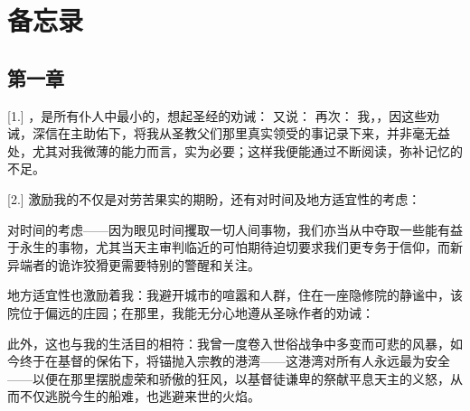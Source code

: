 
\chapter{备忘录}


\par


\section{第一章}

\par

[1.] ，是所有仆人中最小的，想起圣经的劝诫： 又说： 再次： 我，，因这些劝诫，深信在主助佑下，将我从圣教父们那里真实领受的事记录下来，并非毫无益处，尤其对我微薄的能力而言，实为必要；这样我便能通过不断阅读，弥补记忆的不足。\par

[2.] 激励我的不仅是对劳苦果实的期盼，还有对时间及地方适宜性的考虑：\par

对时间的考虑——因为眼见时间攫取一切人间事物，我们亦当从中夺取一些能有益于永生的事物，尤其当天主审判临近的可怕期待迫切要求我们更专务于信仰，而新异端者的诡诈狡猾更需要特别的警醒和关注。\par

地方适宜性也激励着我：我避开城市的喧嚣和人群，住在一座隐修院的静谧中，该院位于偏远的庄园；在那里，我能无分心地遵从圣咏作者的劝诫：\par

此外，这也与我的生活目的相符：我曾一度卷入世俗战争中多变而可悲的风暴，如今终于在基督的保佑下，将锚抛入宗教的港湾——这港湾对所有人永远最为安全——以便在那里摆脱虚荣和骄傲的狂风，以基督徒谦卑的祭献平息天主的义怒，从而不仅逃脱今生的船难，也逃避来世的火焰。\par

